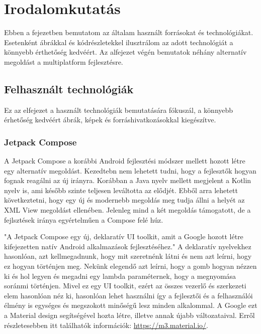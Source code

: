 \chapter{Irodalomkutatás}
\label{sec:Search}

Ebben a fejezetben bemutatom az általam használt forrásokat és technológiákat.
Esetenként ábrákkal és kódrészletekkel ilusztrálom az adott technológiát a könnyebb érthetőség kedvéért.
Az alfejezet végén bemutatok néhány alternatív megoldást a multiplatform fejlesztésre.

\section{Felhasznált technológiák}
\label{sec:Technologies}

Ez az elfejezet a használt technológiák bemutatására fókuszál, a könnyebb érhetőség kedvéért ábrák, képek és forráshivatkozásokkal kiegészítve. 

\subsection{Jetpack Compose}
\label{sec:Compose}

A Jetpack Compose a korábbi Android fejlesztési módszer mellett hozott létre egy alternatív megoldást.
Kezedtebn nem lehetett tudni, hogy a fejlesztők hogyan fognak reagálni az új irányra.
Korábban a Java nyelv mellett megjelent a Kotlin nyelv is, ami később szinte teljesen leváltotta az elődjét.
Ebből arra lehetett következtetni, hogy egy új és modernebb megoldás meg tudja állni a helyét az XML View megoldást ellenében.
Jelenleg mind a két megoldás támogatott, de a fejlsztések iránya egyértelműen a Compose felé húz.

"A Jetpack Compose egy új, deklaratív UI toolkit, amit a Google hozott létre kifejezetten natív Android alkalmazások fejlesztéséhez."\cite{GettingStartedWithJetpackCompose}
A deklaratív nyelvekhez hasonlóan, azt kellmegadnunk, hogy mit szeretnénk látni és nem azt leírni, hogy ez hogyan történjen meg.
Nekünk elegendő azt leírni, hogy a gomb hogyan nézzen ki és hol legyen és megadni egy lambda paraméternek, hogy a megnyomása soránmi történjen.
Mivel ez egy UI toolkit, ezért az összes vezerlő és szerkezeti elem hasonlóan néz ki, hasonlóan lehet használni így a fejlesztői és a felhasználói élmény is egységes és megszokott minőségű lesz minden alkalommal.
A Google ezt a Material design segítségével hozta létre, illetve annak újabb változataival. Erről részletesebben itt találhatók információk: \url{https://m3.material.io/}.

